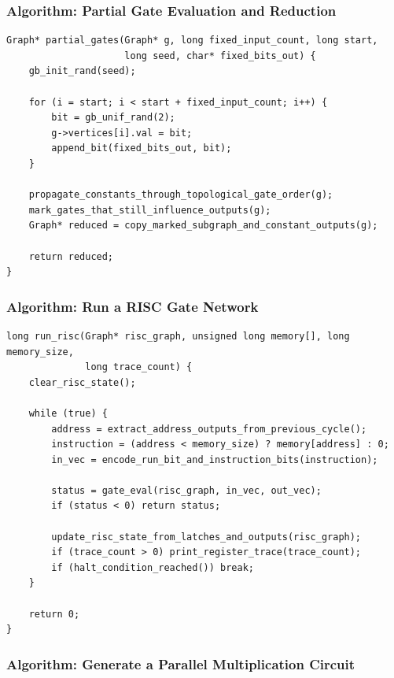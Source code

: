 \documentclass[11pt]{article}
\begin{document}
\subsubsection{Algorithm: Partial Gate Evaluation and Reduction}\label{algorithm-partial-gate-evaluation-and-reduction}

\begin{verbatim}
Graph* partial_gates(Graph* g, long fixed_input_count, long start,
                     long seed, char* fixed_bits_out) {
    gb_init_rand(seed);

    for (i = start; i < start + fixed_input_count; i++) {
        bit = gb_unif_rand(2);
        g->vertices[i].val = bit;
        append_bit(fixed_bits_out, bit);
    }

    propagate_constants_through_topological_gate_order(g);
    mark_gates_that_still_influence_outputs(g);
    Graph* reduced = copy_marked_subgraph_and_constant_outputs(g);

    return reduced;
}
\end{verbatim}

\subsubsection{Algorithm: Run a RISC Gate Network}\label{algorithm-run-a-risc-gate-network}

\begin{verbatim}
long run_risc(Graph* risc_graph, unsigned long memory[], long memory_size,
              long trace_count) {
    clear_risc_state();

    while (true) {
        address = extract_address_outputs_from_previous_cycle();
        instruction = (address < memory_size) ? memory[address] : 0;
        in_vec = encode_run_bit_and_instruction_bits(instruction);

        status = gate_eval(risc_graph, in_vec, out_vec);
        if (status < 0) return status;

        update_risc_state_from_latches_and_outputs(risc_graph);
        if (trace_count > 0) print_register_trace(trace_count);
        if (halt_condition_reached()) break;
    }

    return 0;
}
\end{verbatim}

\subsubsection{Algorithm: Generate a Parallel Multiplication Circuit}\label{algorithm-generate-a-parallel-multiplication-circuit}
\end{document}
